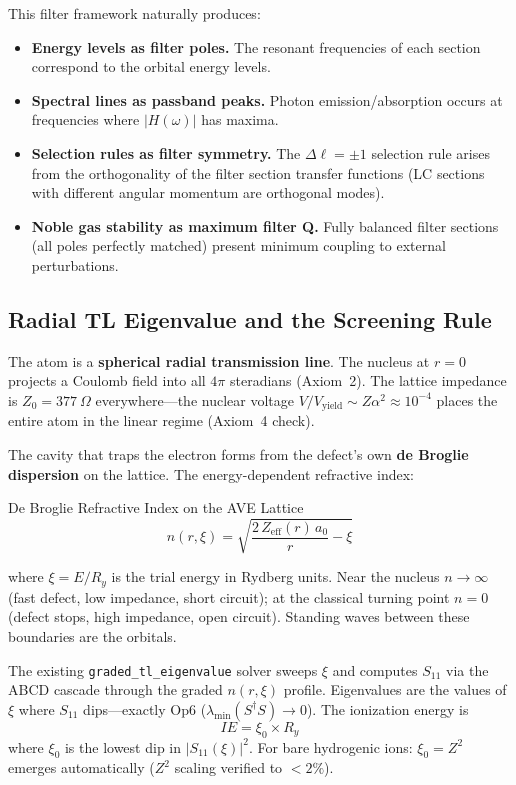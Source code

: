 This filter framework naturally produces:
\begin{itemize}
    \item \textbf{Energy levels as filter poles.} The resonant frequencies of each section correspond to the orbital energy levels.
    \item \textbf{Spectral lines as passband peaks.} Photon emission/absorption occurs at frequencies where $|H(\omega)|$ has maxima.
    \item \textbf{Selection rules as filter symmetry.} The $\Delta \ell = \pm 1$ selection rule arises from the orthogonality of the filter section transfer functions (LC sections with different angular momentum are orthogonal modes).
    \item \textbf{Noble gas stability as maximum filter Q.} Fully balanced filter sections (all poles perfectly matched) present minimum coupling to external perturbations.
\end{itemize}

\subsection{Radial TL Eigenvalue and the Screening Rule}
\label{sec:radial_tl_eigenvalue}

The atom is a \textbf{spherical radial transmission line}.
The nucleus at $r = 0$ projects a Coulomb field into all $4\pi$ steradians (Axiom~2).
The lattice impedance is $Z_0 = 377~\Omega$ everywhere---the nuclear voltage
$V/V_{\text{yield}} \sim Z\alpha^2 \approx 10^{-4}$ places the entire atom in the linear regime
(Axiom~4 check).

The cavity that traps the electron forms from the defect's own
\textbf{de Broglie dispersion} on the lattice.
The energy-dependent refractive index:
\begin{resultbox}{De Broglie Refractive Index on the AVE Lattice}
\begin{equation}
    n(r, \xi) = \sqrt{\frac{2\,Z_{\text{eff}}(r)\,a_0}{r} - \xi}
    \label{eq:de_broglie_n}
\end{equation}
\end{resultbox}
where $\xi = E/R_y$ is the trial energy in Rydberg units.
Near the nucleus $n \to \infty$ (fast defect, low impedance, short circuit);
at the classical turning point $n = 0$ (defect stops, high impedance, open circuit).
Standing waves between these boundaries are the orbitals.

The existing \texttt{graded\_tl\_eigenvalue} solver sweeps $\xi$ and
computes $S_{11}$ via the ABCD cascade through the graded $n(r,\xi)$ profile.
Eigenvalues are the values of $\xi$ where $S_{11}$ dips---exactly Op6 ($\lambda_{\min}(S^\dagger S) \to 0$).
The ionization energy is
\begin{equation}
    IE = \xi_0 \times R_y
    \label{eq:ie_from_tl}
\end{equation}
where $\xi_0$ is the lowest dip in $|S_{11}(\xi)|^2$.
For bare hydrogenic ions: $\xi_0 = Z^2$ emerges automatically ($Z^2$ scaling verified to $< 2\%$).

